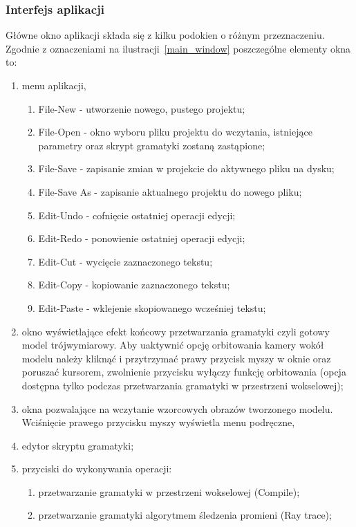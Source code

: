 \subsubsection{Interfejs aplikacji}
Główne okno aplikacji składa się z kilku podokien o różnym przeznaczeniu.
Zgodnie z oznaczeniami na ilustracji~\ref{main_window} poszczególne elementy
okna to:
\begin{enumerate}
  \item menu aplikacji,
  \begin{enumerate}
    \item File-New - utworzenie nowego, pustego projektu;
    \item File-Open - okno wyboru pliku projektu do wczytania, istniejące
    parametry oraz skrypt gramatyki zostaną zastąpione;
    \item File-Save - zapisanie zmian w projekcie do aktywnego pliku na dysku;
    \item File-Save As - zapisanie aktualnego projektu do nowego pliku;
    \item Edit-Undo - cofnięcie ostatniej operacji edycji;
    \item Edit-Redo - ponowienie ostatniej operacji edycji;
    \item Edit-Cut - wycięcie zaznaczonego tekstu;
    \item Edit-Copy - kopiowanie zaznaczonego tekstu;
    \item Edit-Paste - wklejenie skopiowanego wcześniej tekstu;
  \end{enumerate}
  \item okno wyświetlające efekt końcowy przetwarzania gramatyki czyli gotowy
  model trójwymiarowy. Aby uaktywnić opcję orbitowania kamery wokół modelu
  należy kliknąć i przytrzymać prawy przycisk myszy w oknie oraz poruszać
  kursorem, zwolnienie przycisku wyłączy funkcję orbitowania (opcja dostępna
  tylko podczas przetwarzania gramatyki w przestrzeni wokselowej);
  \item okna pozwalające na wczytanie wzorcowych obrazów tworzonego modelu.
  Wciśnięcie prawego przycisku myszy wyświetla menu podręczne,
  \item edytor skryptu gramatyki;
  \item przyciski do wykonywania operacji:
  \begin{enumerate}
    \item przetwarzanie gramatyki w przestrzeni wokselowej (Compile);
    \item przetwarzanie gramatyki algorytmem śledzenia promieni (Ray trace);

\end{enumerate}
\end{enumerate}
